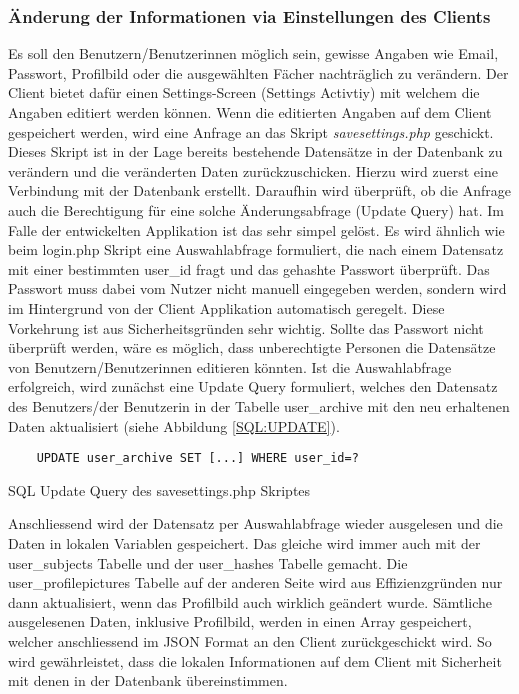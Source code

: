 \documentclass[../main.tex]{subfiles}
\begin{document}
	 \subsubsection{Änderung der Informationen via Einstellungen des Clients}
	 Es soll den Benutzern/Benutzerinnen möglich sein, gewisse Angaben wie Email, Passwort, Profilbild oder die ausgewählten Fächer nachträglich zu verändern. Der Client bietet dafür einen Settings-Screen (Settings Activtiy) mit welchem die Angaben editiert werden können. Wenn die editierten Angaben auf dem Client gespeichert werden, wird eine Anfrage an das Skript \emph{savesettings.php} geschickt. Dieses Skript ist in der Lage bereits bestehende Datensätze in der Datenbank zu verändern und die veränderten Daten zurückzuschicken. Hierzu wird zuerst eine Verbindung mit der Datenbank erstellt. Daraufhin wird überprüft, ob die Anfrage auch die Berechtigung für eine solche Änderungsabfrage (Update Query) hat. Im Falle der entwickelten Applikation ist das sehr simpel gelöst. Es wird ähnlich wie beim login.php Skript eine Auswahlabfrage formuliert, die nach einem Datensatz mit einer bestimmten user\_id fragt und das gehashte Passwort überprüft. Das Passwort muss dabei vom Nutzer nicht manuell eingegeben werden, sondern wird im Hintergrund von der Client Applikation automatisch geregelt. Diese Vorkehrung ist aus Sicherheitsgründen sehr wichtig. Sollte das Passwort nicht überprüft werden, wäre es möglich, dass unberechtigte Personen die Datensätze von Benutzern/Benutzerinnen editieren könnten. Ist die Auswahlabfrage erfolgreich, wird zunächst eine Update Query formuliert, welches den Datensatz des Benutzers/der Benutzerin in der Tabelle user\_archive mit den neu erhaltenen Daten aktualisiert (siehe Abbildung \ref{SQL:UPDATE}).
	 
	 \begin{code} 
	 	\begin{center}
	 		\begin{verbatim}
	UPDATE user_archive SET [...] WHERE user_id=?
	 		\end{verbatim}
	 		\caption{SQL Update Query des savesettings.php Skriptes}\label{SQL:UPDATE}
	 	\end{center}
	 \end{code}
	 
	 Anschliessend wird der Datensatz per Auswahlabfrage wieder ausgelesen und die Daten in lokalen Variablen gespeichert. Das gleiche wird immer auch mit der user\_subjects Tabelle und der user\_hashes Tabelle gemacht. Die user\_profilepictures Tabelle auf der anderen Seite wird aus Effizienzgründen nur dann aktualisiert, wenn das Profilbild auch wirklich geändert wurde. Sämtliche ausgelesenen Daten, inklusive Profilbild, werden in einen Array gespeichert, welcher anschliessend im JSON Format an den Client zurückgeschickt wird. So wird gewährleistet, dass die lokalen Informationen auf dem Client mit Sicherheit mit denen in der Datenbank übereinstimmen.
	 
\end{document}
